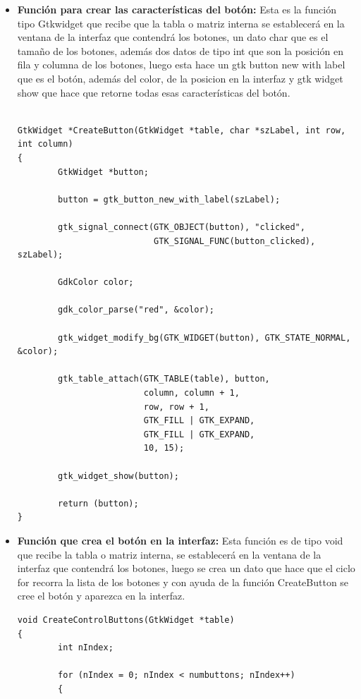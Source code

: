     \begin{itemize}
        \item\textbf{Función para crear las características del botón:}
        Esta es la función tipo Gtkwidget que recibe que la tabla o matriz interna se establecerá en la ventana de la interfaz que contendrá los botones, un dato char que es el tamaño de los botones, además dos datos de  tipo int que son la posición en fila y columna de los botones, luego esta hace un gtk button new with label que es el botón, además del color, de la posicion en la interfaz y  gtk widget show que hace que retorne todas esas características del botón.
        
\begin{lstlisting}

GtkWidget *CreateButton(GtkWidget *table, char *szLabel, int row, int column)
{
        GtkWidget *button;

        button = gtk_button_new_with_label(szLabel);

        gtk_signal_connect(GTK_OBJECT(button), "clicked",
                           GTK_SIGNAL_FUNC(button_clicked), szLabel);

        GdkColor color;

        gdk_color_parse("red", &color);

        gtk_widget_modify_bg(GTK_WIDGET(button), GTK_STATE_NORMAL, &color);

        gtk_table_attach(GTK_TABLE(table), button,
                         column, column + 1,
                         row, row + 1,
                         GTK_FILL | GTK_EXPAND,
                         GTK_FILL | GTK_EXPAND,
                         10, 15);

        gtk_widget_show(button);

        return (button);
}
\end{lstlisting}
        \item\textbf{Función que crea el botón en la interfaz:}
        Esta función es de tipo void que recibe la tabla o matriz interna, se establecerá en la ventana de la interfaz que contendrá los botones, luego se crea un dato que hace que el ciclo for recorra la lista de los botones y con ayuda de la función CreateButton se cree el botón y aparezca en la interfaz.
        
\begin{lstlisting}
void CreateControlButtons(GtkWidget *table)
{
        int nIndex;

        for (nIndex = 0; nIndex < numbuttons; nIndex++)
        {


\end{lstlisting}
\end{itemize}
